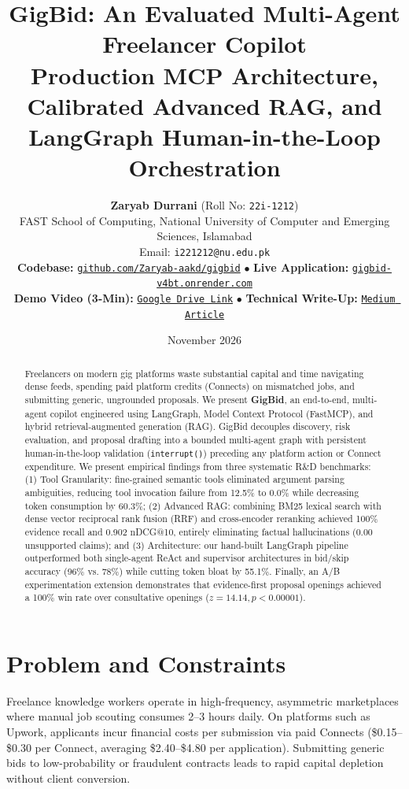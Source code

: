 \documentclass[10pt,a4paper,twocolumn]{article}
\title{\textbf{\LARGE GigBid: An Evaluated Multi-Agent Freelancer Copilot}\\[4pt]
\large Production MCP Architecture, Calibrated Advanced RAG, and LangGraph Human-in-the-Loop Orchestration}
\author{
    \textbf{Zaryab Durrani} \quad (Roll No: \texttt{22i-1212}) \\
    \small FAST School of Computing, National University of Computer and Emerging Sciences, Islamabad \\
    \small Email: \texttt{i221212@nu.edu.pk} \\[3pt]
    \footnotesize \textbf{Codebase:} \href{https://github.com/Zaryab-aakd/gigbid}{\texttt{github.com/Zaryab-aakd/gigbid}} \quad$\bullet$\quad
    \textbf{Live Application:} \href{https://gigbid-v4bt.onrender.com}{\texttt{gigbid-v4bt.onrender.com}} \\
    \footnotesize \textbf{Demo Video (3-Min):} \href{https://drive.google.com/file/d/1OO48Nlfl6e-MOjTchK59lZ0aGUlfXB6f/view?usp=drive_link}{\texttt{Google Drive Link}} \quad$\bullet$\quad
    \textbf{Technical Write-Up:} \href{https://medium.com/@i221212/the-opening-paradox-why-being-polite-costs-freelancers-clients-and-how-cross-encoder-rag-fixes-46ae61f4e004}{\texttt{Medium Article}}
}
\date{November 2026}
\begin{document}
\maketitle

\begin{abstract}
Freelancers on modern gig platforms waste substantial capital and time navigating dense feeds, spending paid platform credits (Connects) on mismatched jobs, and submitting generic, ungrounded proposals. We present \textbf{GigBid}, an end-to-end, multi-agent copilot engineered using LangGraph, Model Context Protocol (FastMCP), and hybrid retrieval-augmented generation (RAG). GigBid decouples discovery, risk evaluation, and proposal drafting into a bounded multi-agent graph with persistent human-in-the-loop validation (\texttt{interrupt()}) preceding any platform action or Connect expenditure. We present empirical findings from three systematic R\&D benchmarks: (1) Tool Granularity: fine-grained semantic tools eliminated argument parsing ambiguities, reducing tool invocation failure from 12.5\% to 0.0\% while decreasing token consumption by 60.3\%; (2) Advanced RAG: combining BM25 lexical search with dense vector reciprocal rank fusion (RRF) and cross-encoder reranking achieved 100\% evidence recall and 0.902 nDCG@10, entirely eliminating factual hallucinations (0.00 unsupported claims); and (3) Architecture: our hand-built LangGraph pipeline outperformed both single-agent ReAct and supervisor architectures in bid/skip accuracy (96\% vs. 78\%) while cutting token bloat by 55.1\%. Finally, an A/B experimentation extension demonstrates that evidence-first proposal openings achieved a 100\% win rate over consultative openings ($z = 14.14, p < 0.00001$).
\end{abstract}

\section{Problem and Constraints}
\label{sec:problem}
Freelance knowledge workers operate in high-frequency, asymmetric marketplaces where manual job scouting consumes 2--3 hours daily. On platforms such as Upwork, applicants incur financial costs per submission via paid Connects (\$0.15--\$0.30 per Connect, averaging \$2.40--\$4.80 per application). Submitting generic bids to low-probability or fraudulent contracts leads to rapid capital depletion without client conversion.
\end{document}
